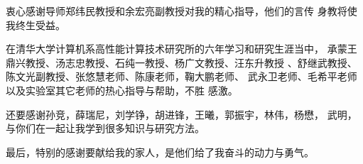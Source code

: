 

\begin{ack}

  衷心感谢导师郑纬民教授和余宏亮副教授对我的精心指导，他们的言传
  身教将使我终生受益。

  在清华大学计算机系高性能计算技术研究所的六年学习和研究生涯当中，
  承蒙王鼎兴教授、汤志忠教授、石纯一教授、杨广文教授、汪东升教授
  、舒继武教授、陈文光副教授、张悠慧老师、陈康老师，鞠大鹏老师、
  武永卫老师、毛希平老师以及实验室其它老师的热心指导与帮助，不胜
  感激。

  还要感谢孙竞，薛瑞尼，刘学铮，胡进锋，王曦，郭振宇，林伟，杨懋，
  武明，与你们在一起让我学到很多知识与研究方法。

  最后，特别的感谢要献给我的家人，是他们给了我奋斗的动力与勇气。

\end{ack}
